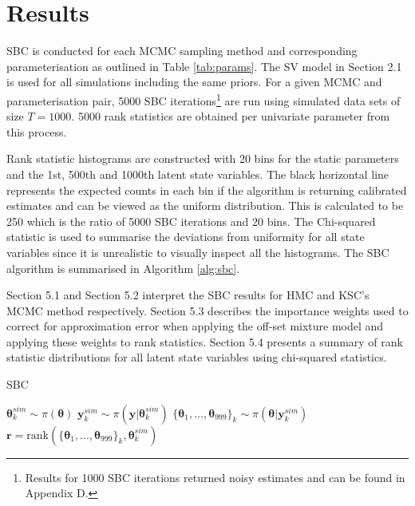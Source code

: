 \documentclass[12pt, a4paper]{article}
\begin{document}



\section{Results}
    SBC is conducted for each MCMC sampling method and corresponding parameterisation as outlined in Table \ref{tab:params}. The SV model in Section 2.1 is used for all simulations including the same priors. For a given MCMC and parameterisation pair, 5000 SBC iterations\footnote{Results for 1000 SBC iterations returned noisy estimates and can be found in Appendix D.} are run using simulated data sets of size $T=1000$. 5000 rank statistics are obtained per univariate parameter from this process. 
    
    Rank statistic histograms are constructed with 20 bins for the static parameters and the 1st, 500th and 1000th latent state variables. The black horizontal line represents the expected counts in each bin if the algorithm is returning calibrated estimates and can be viewed as the uniform distribution. This is calculated to be 250 which is the ratio of  5000 SBC iterations and 20 bins. The Chi-squared statistic is used to summarise the deviations from uniformity for all state variables since it is unrealistic to visually inspect all the histograms. The SBC algorithm is summarised in Algorithm \ref{alg:sbc}.

    Section 5.1 and Section 5.2 interpret the SBC results for HMC and KSC's MCMC method respectively. Section 5.3 describes the importance weights used to correct for approximation error when applying the off-set mixture model and applying these weights to rank statistics. Section 5.4 presents a summary of rank statistic distributions for all latent state variables using chi-squared statistics. 
    
    \begin{algorithm}
        \caption{SBC}\label{alg:sbc}
        \begin{algorithmic}
                \State {} $\boldsymbol{\theta}^{sim}_k \sim\pi (\boldsymbol{\theta})$
                \State {} $\boldsymbol{y}^{sim}_k \sim \pi(\boldsymbol{y}|\boldsymbol{\theta}^{sim}_k)$
                \State {} $\{\boldsymbol{\theta}_1,\dots , \boldsymbol{\theta}_{999}\}_k \sim \pi(\boldsymbol{\theta} | \boldsymbol{y}^{sim}_k)$
                \State {} $\boldsymbol{r} = \mathrm{rank}(\{\boldsymbol{\theta}_1,\dots , \boldsymbol{\theta}_{999}\}_k, \boldsymbol{\theta}^{sim}_k)$
              \EndFor
        \end{algorithmic}
        \end{algorithm}
        
\end{document}

